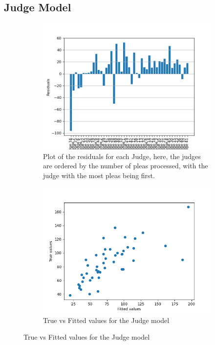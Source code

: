 \documentclass[11pt]{article}
\begin{document}
    \begin{table}[H]
      \centering
      \small
      \caption{Lambda Estimates, County Model}
      \label{county-lambda}
      
    \end{table}

  \subsection{Judge Model}
    \begin{figure}[H]
      \centering
        \begin{subfigure}[b]{0.45\textwidth}
          \includegraphics[width=\textwidth]{../../../output/figures/Exploration/resid_plot_JudgeID.png}
          \caption{Plot of the residuals for each Judge, here, the judges are ordered by the number of pleas processed, with the judge with the most pleas being first. }
        \end{subfigure}
        \hfill
        \begin{subfigure}[b]{0.45\textwidth}
          \includegraphics[width=\textwidth]{../../../output/figures/Exploration/true_vs_fitted_JudgeID.png}
          \caption{True vs Fitted values for the Judge model}

        \end{subfigure}
        \label{judge-figs}
    \end{figure}
\end{document}

